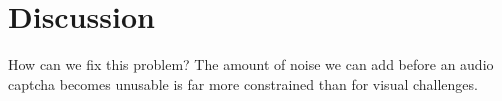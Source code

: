 \section{Discussion}
\label{sec:discussion}

How can we fix this problem? The amount of noise we can add before an audio captcha becomes unusable is 
far more constrained than for visual challenges.
